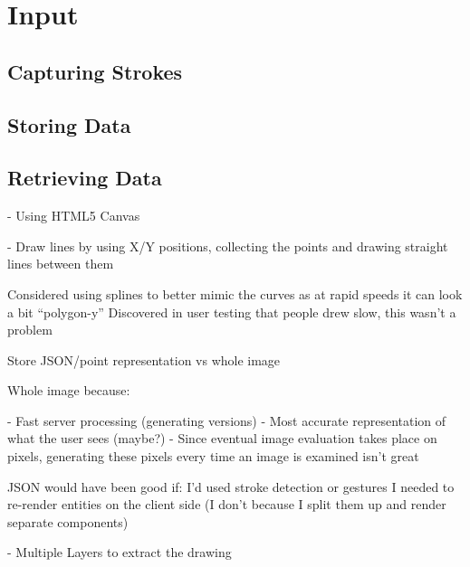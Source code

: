 \section{Input}

\subsection{Capturing Strokes}

\subsection{Storing Data}

\subsection{Retrieving Data}

- Using HTML5 Canvas

- Draw lines by using X/Y positions, collecting the points and drawing straight lines between them

Considered using splines to better mimic the curves as at rapid speeds it can look a bit ``polygon-y''
Discovered in user testing that people drew slow, this wasn't a problem

Store JSON/point representation vs whole image

Whole image because:

- Fast server processing (generating versions)
- Most accurate representation of what the user sees (maybe?)
- Since eventual image evaluation takes place on pixels, generating these pixels every time an image is examined isn't great

JSON would have been good if:
I'd used stroke detection or gestures
I needed to re-render entities on the client side (I don't because I split them up and render separate components)

- Multiple Layers to extract the drawing
